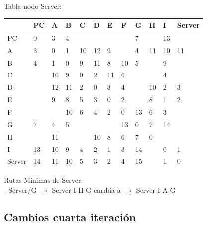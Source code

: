 \documentclass[a4paper]{article}
\begin{document}
\begin{table}[h]
Tabla nodo Server:\\
\begin{tabular}{|l|l|l|l|l|l|l|l|l|l|l|l|}
\hline
       & PC & A  & B  & C  & D  & E  & F  & G  & H  & I  & Server \\ \hline
PC     & 0  & 3  & 4  &    &    &    &    & 7  &    & 13 &        \\ \hline
A      & 3  & 0  & 1  & 10 & 12 & 9  &    & 4  & 11 & 10 & 11     \\ \hline
B      & 4  & 1  & 0  & 9  & 11 & 8  & 10 & 5  &    & 9  &        \\ \hline
C      &    & 10 & 9  & 0  & 2  & 11 & 6  &    &    & 4  &        \\ \hline
D      &    & 12 & 11 & 2  & 0  & 3  & 4  &    & 10 & 2  & 3      \\ \hline
E      &    & 9  & 8  & 5  & 3  & 0  & 2  &    & 8  & 1  & 2      \\ \hline
F      &    &    & 10 & 6  & 4  & 2  & 0  & 13 & 6  & 3  &        \\ \hline
G      & 7  & 4  & 5  &    &    &    & 13 & 0  & 7  & 14 &        \\ \hline
H      &    & 11 &    &    & 10 & 8  & 6  & 7  & 0  &    &        \\ \hline
I      & 13 & 10 & 9  & 4  & 2  & 1  & 3  & 14 &    & 0  & 1      \\ \hline
Server & 14 & 11 & 10 & 5  & 3  & 2  & 4  & 15 &    & 1  & 0      \\ \hline
\end{tabular}

Rutas Mínimas de Server:\\
-	Server/G  $\rightarrow$  Server-I-H-G  cambia a  $\rightarrow$ Server-I-A-G\\

\end{table}
\clearpage

\subsection{Cambios cuarta iteración}
\end{document}
